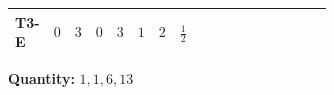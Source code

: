\documentclass[8pt]{article}
\begin{document}
\begin{landscape}
\begin{longtable}{@{}llcccccc >{\raggedright\arraybackslash}p{0.21\linewidth} >{\raggedright\arraybackslash}p{0.21\linewidth} >{\raggedright\arraybackslash}p{0.21\linewidth}@{}}
\midrule
T3-E & $0$ & $3$ & $0$ & $3$ & $1$ & $2$ & $\frac{1}{2}$ & \scriptsize\adjustbox{max width=\linewidth}{$\begin{gathered} - \frac{\sqrt{3} g_{2}^{2} \overline{y_{1}} \overline{y_{2}}}{6 MF}\end{gathered}$} & \scriptsize\adjustbox{max width=\linewidth}{$\begin{gathered} - \frac{\sqrt{3} i lambda12Inv1 \overline{y_{1}} \overline{y_{2}}}{6 MF}\end{gathered}$} & \scriptsize\adjustbox{max width=\linewidth}{$\begin{gathered} \frac{\sqrt{3} i g_{1}^{2} \overline{y_{1}} \overline{y_{2}}}{8 MF}\end{gathered}$} \\
\midrule
\bottomrule
\end{longtable}
\clearpage
\noindent\textbf{Quantity: }$\mathrm{1,1,6,13}$\par\smallskip

\end{landscape}
\end{document}
